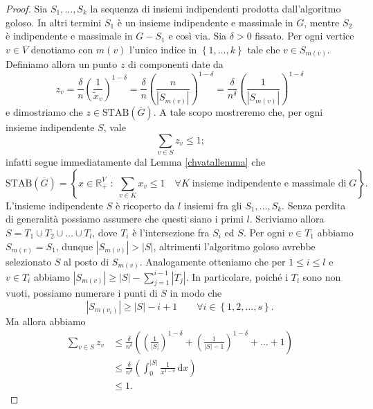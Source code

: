 \begin{proof}
  Sia \(S_1,\dots,S_k\) la sequenza di insiemi indipendenti prodotta dall'algoritmo goloso. In altri termini \(S_1\) è un insieme indipendente e massimale in \(G\), mentre \(S_2\) è indipendente e massimale in \(G-S_1\) e così via. Sia \(\delta>0\) fissato. Per ogni vertice \(v\in V\) denotiamo con \(m(v)\) l'unico indice in \(\left\{1,\dots,k\right\}\) tale che \(v\in S_{m(v)}\). Definiamo allora un punto \(z\) di componenti date da
  \[z_v=\frac{\delta}{n}\left(\frac{1}{\tilde{x}_v}\right)^{1-\delta}=\frac{\delta}{n}\left(\frac{n}{|S_{m(v)}|}\right)^{1-\delta}=\frac{\delta}{n^{\delta}}\left(\frac{1}{|S_{m(v)}|}\right)^{1-\delta}\]
  e dimostriamo che \(z\in\text{STAB}(\overline{G})\). A tale scopo mostreremo che, per ogni insieme indipendente \(S\), vale
  \[\sum_{v\in S}{z_v}\le 1\text{;}\]
  infatti segue immediatamente dal Lemma \ref{chvatallemma} che
  \[
    \text{STAB}(\overline{G}) = \left\{x\in \mathbb{R}_{+}^V\;:\;\sum_{v\in K}{x_v}\le 1\quad \forall K\;\text{insieme indipendente e massimale di}\;G\right\}\text{.}
  \]
  L'insieme indipendente \(S\) è ricoperto da \(l\) insiemi fra gli \(S_1,\dots,S_k\). Senza perdita di generalità possiamo assumere che questi siano i primi \(l\). Scriviamo allora \(S=T_1\cup T_2\cup\dots\cup T_l\), dove \(T_i\) è l'intersezione fra \(S_i\) ed \(S\). Per ogni \(v\in T_1\) abbiamo \(S_{m(v)}=S_1\), dunque \(|S_{m(v)}|>|S|\), altrimenti l'algoritmo goloso avrebbe selezionato \(S\) al posto di \(S_{m(v)}\). Analogamente otteniamo che per \(1\le i\le l\) e \(v\in T_i\) abbiamo \(|S_{m(v)}|\ge |S|-\sum_{j=1}^{i-1}{|T_j|}\). In particolare, poiché i \(T_i\) sono non vuoti, possiamo numerare i punti di \(S\) in modo che
  \[
    |S_{m(v_i)}| \ge |S| - i + 1\qquad\forall i\in\left\{1,2,\dots,s\right\}\text{.}
  \]
  Ma allora abbiamo
  \begin{align}
    \sum_{v\in S}{z_v} &\le \frac{\delta}{n^{\delta}}\left(\left(\frac{1}{|S|}\right)^{1-\delta}+\left(\frac{1}{|S|-1}\right)^{1-\delta}+\dots+1\right) \nonumber \\
    &\le \frac{\delta}{n^{\delta}}\left(\int_{0}^{|S|}{\frac{1}{x^{1-\delta}}\,\mathrm{d}x}\right) \nonumber \\
    &\le 1\text{.} \nonumber
  \end{align}
  

\end{proof}
